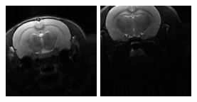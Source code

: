 \begin{figure}[ht] 
  \begin{minipage}[b]{0.5\linewidth}
    \centering
    \includegraphics[width=\linewidth]{0.png} 
  \end{minipage} 
  \begin{minipage}[b]{0.5\linewidth}
    \centering
    \includegraphics[width=\linewidth]{1.png} 

\end{minipage}
\end{figure}
